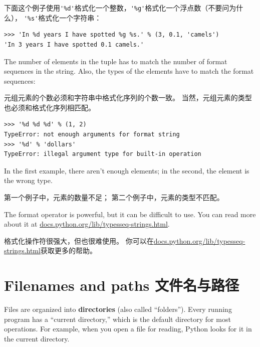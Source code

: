 \documentclass[10pt]{book}
\begin{document}
\begin{CJK}{UTF8}{gbsn}
下面这个例子使用\verb"'%d'"格式化一个整数，\verb"'%g'"格式化一个浮点数（不要问为什么），
\verb"'%s'"格式化一个字符串：

\begin{verbatim}
>>> 'In %d years I have spotted %g %s.' % (3, 0.1, 'camels')
'In 3 years I have spotted 0.1 camels.'
\end{verbatim}
%
The number of elements in the tuple has to match the number
of format sequences in the string.  Also, the types of the
elements have to match the format sequences:

元组元素的个数必须和字符串中格式化序列的个数一致。
当然，元组元素的类型也必须和格式化序列相匹配。

\begin{verbatim}
>>> '%d %d %d' % (1, 2)
TypeError: not enough arguments for format string
>>> '%d' % 'dollars'
TypeError: illegal argument type for built-in operation
\end{verbatim}
%
In the first example, there aren't enough elements; in the
second, the element is the wrong type.

第一个例子中，元素的数量不足；
第二个例子中，元素的类型不匹配。

The format operator is powerful, but it can be difficult to use.  You
can read more about it at
\url{docs.python.org/lib/typesseq-strings.html}.

格式化操作符很强大，但也很难使用。
你可以在\url{docs.python.org/lib/typesseq-strings.html}获取更多的帮助。




\section{Filenames and paths 文件名与路径}
\label{paths}

Files are organized into {\bf directories} (also called ``folders'').
Every running program has a ``current directory,'' which is the
default directory for most operations.  
For example, when you open a file for reading, Python looks for it in the
current directory.


\end{CJK}
\end{document}
